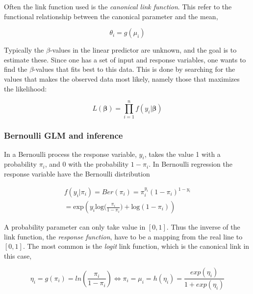 
Often the link function used is the \textit{canonical link function}. This refer to the functional relationship between the canonical parameter and the mean,

\begin{equation}
\theta_i = g(\mu_i)
\end{equation}



Typically the $\beta$-values in the linear predictor are unknown, and the goal is to estimate these. Since one has a set of input and response variables, one wants to find the $\beta$-values that fits best to this data. This is done by searching for the values that makes the observed data most likely, namely those that maximizes the likelihood:

\begin{equation}
    L(\bm{\beta}) = \prod_{i=1}^{n} f(y_i |\bm{ \beta})
\end{equation}

\subsubsection{Bernoulli GLM and inference}
In a Bernoulli process the response variable, $y_i$, takes the value 1 with a probability $\pi_i$, and 0 with the probability $1-\pi_i$. In Bernoulli regression the response variable have the Bernoulli distribution

\begin{equation}
\begin{split}
    f(y_i|\pi_i) = Ber(\pi_i) = \pi_i^{y_i}(1-\pi_i)^{1-y_i}\\
    = \text{exp} ( y_i  \text{log}\big(\frac{\pi_i}{1-\pi_i}\big) + \text{log}(1-\pi_i))
\end{split}
\end{equation}

A probability parameter can only take value in $[0,1]$. Thus the inverse of the link function, the \textit{response function}, have to be a mapping from the real line to $[0,1]$. The most common is the \textit{logit} link function, which is the canonical link in this case,

\begin{equation}
    \eta_i = g(\pi_i) = ln(\frac{\pi_i}{1-\pi_i}) \Leftrightarrow 
    \pi_i = \mu_i = h(\eta_i) = \frac{exp(\eta_i)}{1+exp(\eta_i)}
\end{equation}


